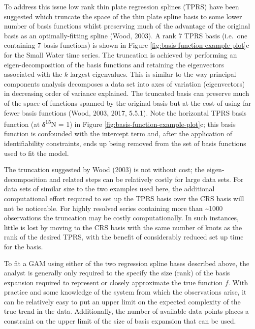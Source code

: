 \documentclass[12pt,]{article}
\begin{document}
To address this issue low rank thin plate regression splines (TPRS) have
been suggested which truncate the space of the thin plate spline basis
to some lower number of basis functions whilst preserving much of the
advantage of the original basis as an optimally-fitting spline (Wood,
2003). A rank 7 TPRS basis (i.e.~one containing 7 basis functions) is
shown in Figure \ref{fig:basis-function-example-plot}c for the Small
Water time series. The truncation is achieved by performing an
eigen-decomposition of the basis functions and retaining the
eigenvectors associated with the \(k\) largest eigenvalues. This is
similar to the way principal components analysis decomposes a data set
into axes of variation (eigenvectors) in decreasing order of variance
explained. The truncated basis can preserve much of the space of
functions spanned by the original basis but at the cost of using far
fewer basis functions (Wood, 2003, 2017, 5.5.1). Note the horizontal
TPRS basis function (at δ\textsuperscript{15}N = 1) in Figure
\ref{fig:basis-function-example-plot}c; this basis function is
confounded with the intercept term and, after the application of
identifiability constraints, ends up being removed from the set of basis
functions used to fit the model.

The truncation suggested by Wood (2003) is not without cost; the
eigen-decomposition and related steps can be relatively costly for large
data sets. For data sets of similar size to the two examples used here,
the additional computational effort required to set up the TPRS basis
over the CRS basis will not be noticeable. For highly resolved series
containing more than \textasciitilde{}1000 observations the truncation
may be costly computationally. In such instances, little is lost by
moving to the CRS basis with the same number of knots as the rank of the
desired TPRS, with the benefit of considerably reduced set up time for
the basis.

To fit a GAM using either of the two regression spline bases described
above, the analyst is generally only required to the specify the size
(rank) of the basis expansion required to represent or closely
approximate the true function \(f\). With practice and some knowledge of
the system from which the observations arise, it can be relatively easy
to put an upper limit on the expected complexity of the true trend in
the data. Additionally, the number of available data points places a
constraint on the upper limit of the size of basis expansion that can be
used.
\end{document}
